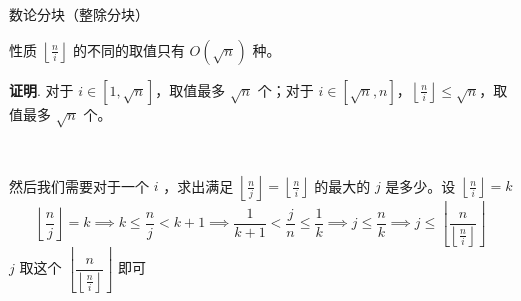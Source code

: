 \documentclass[UTF8]{beamer}
\begin{document}
    \begin{frame}{数论分块（整除分块）}
        \begin{block}{性质}
            $\left\lfloor\frac{n}{i}\right\rfloor$ 的不同的取值只有 $O(\sqrt{n})$ 种。
        \end{block}
        \textbf{证明}. 对于 $i\in [1,\sqrt{n}]$，取值最多 $\sqrt{n}$ 个；对于 $i\in [\sqrt{n},n]$，$\left\lfloor\frac{n}{i}\right\rfloor\le \sqrt{n}$，取值最多 $\sqrt{n}$ 个。\\
        \begin{tiny}{$\ $}\end{tiny}\\
        \pause
        然后我们需要对于一个 $i$ ，求出满足 $\left\lfloor\frac{n}{j}\right\rfloor=\left\lfloor\frac{n}{i}\right\rfloor$ 的最大的 $j$ 是多少。设 $\left\lfloor\frac{n}{i}\right\rfloor=k$
        $$
        \left\lfloor\frac{n}{j}\right\rfloor=k\implies k\le \frac{n}{j}<k+1
        \implies \frac{1}{k+1} <\frac{j}{n}\le \frac{1}{k} \implies j\le \frac{n}{k}
        \implies j\le \left\lfloor\frac{n}{\left\lfloor\frac{n}{i}\right\rfloor}\right\rfloor
        $$
        $j$ 取这个 $\left\lfloor\dfrac{n}{\left\lfloor\frac{n}{i}\right\rfloor}\right\rfloor$ 即可
    \end{frame}
\end{document}
